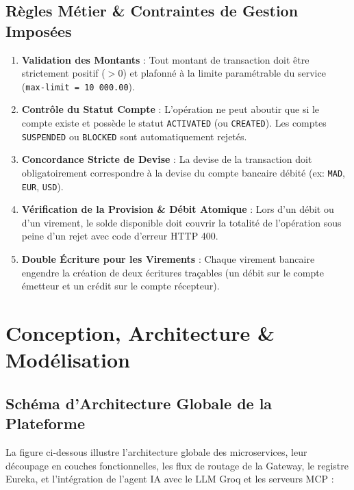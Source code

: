 \documentclass[11pt,a4paper]{report}
\begin{document}
\section{Règles Métier \& Contraintes de Gestion Imposées}
\begin{tcolorbox}[colback=lightgray,colframe=primary,title=\textbf{Règles Métier Clés Implémentées}]
\begin{enumerate}
    \item \textbf{Validation des Montants} : Tout montant de transaction doit être strictement positif ($> 0$) et plafonné à la limite paramétrable du service (\texttt{max-limit = 10 000.00}).
    \item \textbf{Contrôle du Statut Compte} : L'opération ne peut aboutir que si le compte existe et possède le statut \texttt{ACTIVATED} (ou \texttt{CREATED}). Les comptes \texttt{SUSPENDED} ou \texttt{BLOCKED} sont automatiquement rejetés.
    \item \textbf{Concordance Stricte de Devise} : La devise de la transaction doit obligatoirement correspondre à la devise du compte bancaire débité (ex: \texttt{MAD}, \texttt{EUR}, \texttt{USD}).
    \item \textbf{Vérification de la Provision \& Débit Atomique} : Lors d'un débit ou d'un virement, le solde disponible doit couvrir la totalité de l'opération sous peine d'un rejet avec code d'erreur HTTP 400.
    \item \textbf{Double Écriture pour les Virements} : Chaque virement bancaire engendre la création de deux écritures traçables (un débit sur le compte émetteur et un crédit sur le compte récepteur).
\end{enumerate}
\end{tcolorbox}

\chapter{Conception, Architecture \& Modélisation}

\section{Schéma d'Architecture Globale de la Plateforme}
La figure ci-dessous illustre l'architecture globale des microservices, leur découpage en couches fonctionnelles, les flux de routage de la Gateway, le registre Eureka, et l'intégration de l'agent IA avec le LLM Groq et les serveurs MCP :
\end{document}
